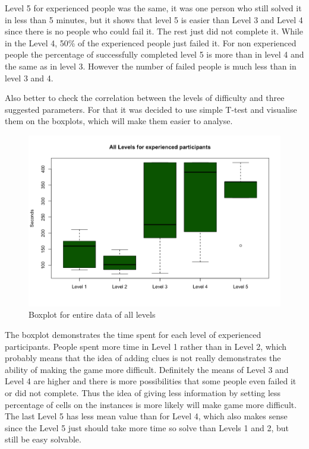 Level 5 for experienced people was the same, it was one person who still solved it in less than 5 minutes, but it shows that level 5 is easier than Level 3 and Level 4 since there is no people who could fail it. The rest just did not complete it. While in the Level 4, 50\% of the experienced people just failed it. For non experienced people the percentage of successfully completed level 5 is more than in level 4 and the same as in level 3. However the number of failed people is much less than in level 3 and 4. 

Also better to check the correlation between the levels of difficulty and three suggested parameters. For that it was decided to use simple T-test and visualise them on the boxplots, which will make them easier to analyse.

\begin{figure}[h]
\centering
\includegraphics[width= 1.0\textwidth]{img/boxplot_all_experienced.png}
\caption{Boxplot for entire data of all levels}
\label{fig:boxplot_wholedata}
\end{figure}

The boxplot demonstrates the time spent for each level of experienced participants. People spent more time in Level 1 rather than in Level 2, which probably means that the idea of adding clues is not really demonstrates the ability of making the game more difficult. 
Definitely the means of Level 3 and Level 4 are higher and there is more possibilities that some people even failed it or did not complete. Thus the idea of giving less information by setting less percentage of cells on the instances is more likely will make game more difficult. The last Level 5 has less mean value than for Level 4, which also makes sense since the Level 5 just should take more time so solve than Levels 1 and 2, but still be easy solvable. 

